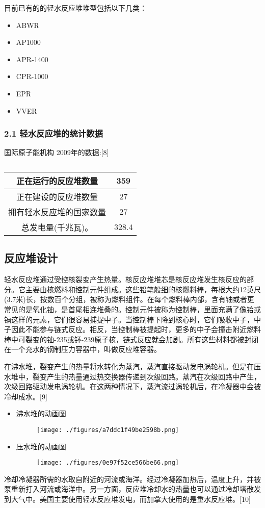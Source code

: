 目前已有的的轻水反应堆堆型包括以下几类：
\begin{itemize}
\item ABWR
\item AP1000
\item APR-1400
\item CPR-1000
\item EPR
\item VVER
\end{itemize}

\subsubsection{2.1 轻水反应堆的统计数据}

国际原子能机构 2009年的数据:[8]
\begin{table}[ht]
\centering
\caption\label{QSFYD}
\begin{tabular}{|c|c}
\hline
正在运行的反应堆数量 & 359\\
\hline
正在建设的反应堆数量 & 27\\
\hline
拥有轻水反应堆的国家数量 & 27\\
\hline
总发电量(千兆瓦)。 & 328.4\\
\hline
\end{tabular}
\end{table}

\subsection{反应堆设计}
轻水反应堆通过受控核裂变产生热量。核反应堆堆芯是核反应堆发生核反应的部分。它主要由核燃料和控制元件组成。这些铅笔般细的核燃料棒，每根大约12英尺(3.7米)长，按数百个分组，被称为燃料组件。在每个燃料棒内部，含有铀或者更常见的是氧化铀，是首尾相连堆叠的。控制元件被称为控制棒，里面充满了像铪或镉这样的元素，它们很容易捕捉中子。当控制棒下降到核心时，它们吸收中子，中子因此不能参与链式反应。相反，当控制棒被提起时，更多的中子会撞击附近燃料棒中可裂变的铀-235或钚-239原子核，链式反应就会加剧。所有这些材料都被封闭在一个充水的钢制压力容器中，叫做反应堆容器。

在沸水堆，裂变产生的热量将水转化为蒸汽，蒸汽直接驱动发电涡轮机。但是在压水堆中，裂变产生的热量通过热交换器传递到次级回路。蒸汽在次级回路中产生，次级回路驱动发电涡轮机。在这两种情况下，蒸汽流过涡轮机后，在冷凝器中会被冷却成水。[9]
\begin{itemize}
\item 沸水堆的动画图
\begin{figure}[ht]
\centering
\texttt{[image: ./figures/a7ddc1f49be2598b.png]}
\caption\label{fig_QSFYD_2}
\end{figure}

\item 压水堆的动画图
\begin{figure}[ht]
\centering
\texttt{[image: ./figures/0e97f52ce566be66.png]}
\caption\label{fig_QSFYD_3}
\end{figure}
\end{itemize}
冷却冷凝器所需的水取自附近的河流或海洋。经过冷凝器加热后，温度上升，并被泵重新打入河流或海洋中。另一方面，反应堆冷却水的热量也可以通过冷却塔散发到大气中。美国主要使用轻水反应堆发电，而加拿大使用的是重水反应堆。[10]

